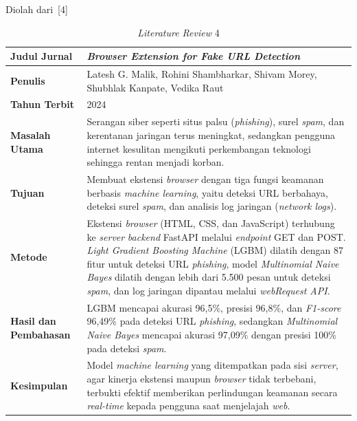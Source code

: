 \documentclass[12pt,a4paper,twoside]{report}
\begin{document}
\clearpage
\begin{table}[H]
  \centering
  \caption{\textit{Literature Review} 4}
  \label{tab:sota4}
  \par\nopagebreak\vspace{2pt}Diolah dari~[4]\par\vspace{4pt}
  \begin{spacing}{1.0}
  \normalsize
  \begin{tabular}{|L{119.5pt}|L{251.5pt}|}
    \hline
    \textbf{Judul Jurnal} & \raggedright\arraybackslash \textit{Browser Extension for Fake URL Detection} \\ \hline
    \textbf{Penulis} & \raggedright\arraybackslash Latesh G. Malik, Rohini Shambharkar, Shivam Morey, Shubhlak Kanpate, Vedika Raut \\ \hline
    \textbf{Tahun Terbit} & 2024 \\ \hline
    \textbf{Masalah Utama} & Serangan siber seperti situs palsu (\textit{phishing}), surel \textit{spam}, dan kerentanan jaringan terus meningkat, sedangkan pengguna internet kesulitan mengikuti perkembangan teknologi sehingga rentan menjadi korban. \\ \hline
    \textbf{Tujuan} & Membuat ekstensi \textit{browser} dengan tiga fungsi keamanan berbasis \textit{machine learning}, yaitu deteksi URL berbahaya, deteksi surel \textit{spam}, dan analisis log jaringan (\textit{network logs}). \\ \hline
    \textbf{Metode} & Ekstensi \textit{browser} (HTML, CSS, dan JavaScript) terhubung ke \textit{server} \textit{backend} FastAPI melalui \textit{endpoint} GET dan POST. \textit{Light Gradient Boosting Machine} (LGBM) dilatih dengan 87 fitur untuk deteksi URL \textit{phishing}, model \textit{Multinomial Naive Bayes} dilatih dengan lebih dari 5.500 pesan untuk deteksi \textit{spam}, dan log jaringan dipantau melalui \textit{webRequest API}. \\ \hline
    \textbf{Hasil dan Pembahasan} & LGBM mencapai akurasi 96,5\%, presisi 96,8\%, dan \textit{F1-score} 96,49\% pada deteksi URL \textit{phishing}, sedangkan \textit{Multinomial Naive Bayes} mencapai akurasi 97,09\% dengan presisi 100\% pada deteksi \textit{spam}. \\ \hline
    \textbf{Kesimpulan} & Model \textit{machine learning} yang ditempatkan pada sisi \textit{server}, agar kinerja ekstensi maupun \textit{browser} tidak terbebani, terbukti efektif memberikan perlindungan keamanan secara \textit{real-time} kepada pengguna saat menjelajah \textit{web}. \\ \hline
  \end{tabular}
  \end{spacing}
\end{table}
\end{document}
